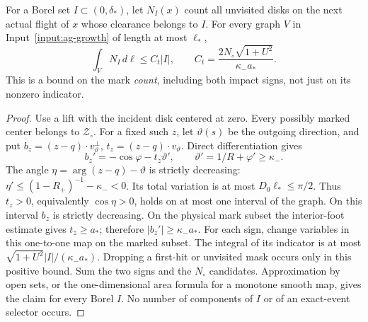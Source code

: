 \begin{lemma}
\label{lem:ag-band}
For a Borel set $I\subset(0,\delta_*)$, let $N_I(x)$ count all
unvisited disks on the next actual flight of $x$ whose clearance
belongs to $I$. For every graph $V$ in
Input~\ref{input:ag-growth} of length at most $\ell_*$,
\begin{equation}\label{eq:ag-band}
 \int_V N_I\,d\ell\le C_t|I|,
 \qquad C_t=\frac{2N_\circ\sqrt{1+U^2}}{\kappa_-a_*}.
\end{equation}
This is a bound on the mark \emph{count}, including both impact
signs, not just on its nonzero indicator.
\end{lemma}
\begin{proof}
Use a lift with the incident disk centered at zero. Every possibly
marked center belongs to $\mathcal Z_\circ$. For a fixed such $z$,
let $\vartheta(s)$ be the outgoing direction, and put
$b_z=(z-q)\cdot v_\vartheta^\perp$,
$t_z=(z-q)\cdot v_\vartheta$. Direct differentiation gives
\[
 b_z'=-\cos\varphi-t_z\vartheta',\qquad
                 \vartheta'=1/R+\varphi'\ge\kappa_-.
\]
The angle $\eta=\arg(z-q)-\vartheta$ is strictly decreasing:
$\eta'\le(1-R_+)^{-1}-\kappa_-<0$. Its total variation is at
most $D_0\ell_*\le\pi/2$. Thus $t_z>0$, equivalently
$\cos\eta>0$, holds on at most one interval of the graph.
On this interval $b_z$ is strictly decreasing. On the physical
mark subset the interior-foot estimate gives $t_z\ge a_*$;
therefore $|b_z'|\ge\kappa_-a_*$. For each sign, change variables
in this one-to-one map on the marked subset. The integral of its
indicator is at most
$\sqrt{1+U^2}|I|/(\kappa_-a_*)$. Dropping a first-hit or
unvisited mask occurs only in this positive bound. Sum the two
signs and the $N_\circ$ candidates. Approximation by open sets,
or the one-dimensional area formula for a monotone smooth map,
gives the claim for every Borel $I$. No number of components of
$I$ or of an exact-event selector occurs.
\end{proof}

